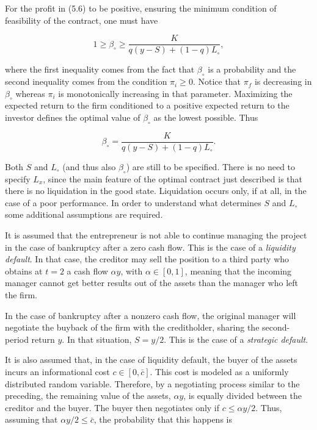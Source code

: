 \documentclass[11pt,a4paper]{article}
\begin{document}
For the profit in (5.6) to be positive, ensuring the minimum condition of feasibility of the
contract, one must have

\[1 \geq \beta_\circ \geq \frac{K}{q(y - S) + (1 - q)L_\circ},\]

where the first inequality comes from the fact that \(\beta_\circ\) is a probability and the second
inequality comes from the condition \(\pi_i \geq 0\). Notice that \(\pi_f\) is decreasing in
\(\beta_\circ\) whereas \(\pi_i\) is monotonically increasing in that parameter. Maximizing the
expected return to the firm conditioned to a positive expected return to the investor defines the
optimal value of \(\beta_\circ\) as the lowest possible. Thus

\[\beta_\circ = \frac{K}{q(y - S) + (1 - q)L_\circ}.\]

Both \(S\) and \(L_\circ\) (and thus also \(\beta_\circ\)) are still to be specified. There is no
need to specify \(L_x\), since the main feature of the optimal contract just described is that there
is no liquidation in the good state. Liquidation occurs only, if at all, in the case of a poor
performance. In order to understand what determines \(S\) and \(L_\circ\) some additional
assumptions are required.

It is assumed that the entrepreneur is not able to continue managing the project in the case of
bankruptcy after a zero cash flow. This is the case of a \emph{liquidity default}. In that case, the
creditor may sell the position to a third party who obtains at \(t = 2\) a cash flow \(\alpha y\),
with \(\alpha \in [0, 1]\), meaning that the incoming manager cannot get better results out of the
assets than the manager who left the firm.

In the case of bankruptcy after a nonzero cash flow, the original manager will negotiate the buyback
of the firm with the creditholder, sharing the second-period return \(y\). In that situation,
\(S = y/2\). This is the case of a \emph{strategic default}.

It is also assumed that, in the case of liquidity default, the buyer of the assets incurs an
informational cost \(c \in [0, \bar c]\). This cost is modeled as a uniformly distributed random
variable. Therefore, by a negotiating process similar to the preceding, the remaining value of the
assets, \(\alpha y\), is equally divided between the creditor and the buyer. The buyer then
negotiates only if \(c \leq \alpha y/2\). Thus, assuming that \(\alpha y/2 \leq \bar c\), the
probability that this happens is
\end{document}
